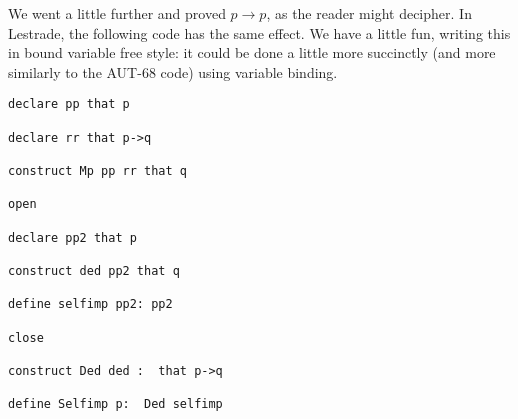 \documentclass{article}
\begin{document}
We went a little further and proved $p \rightarrow p$, as the reader might decipher.  In Lestrade, the following code has the same effect.  We have a little fun, writing this in bound variable free style:  it could be done a little more succinctly (and more similarly to the AUT-68 code) using variable binding.

\begin{verbatim}
declare pp that p

declare rr that p->q

construct Mp pp rr that q

open

declare pp2 that p

construct ded pp2 that q

define selfimp pp2: pp2

close

construct Ded ded :  that p->q

define Selfimp p:  Ded selfimp




\end{verbatim}
\end{document}
